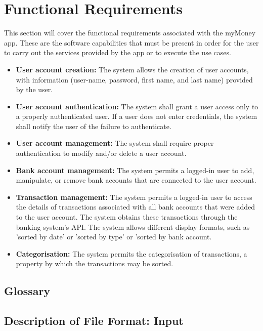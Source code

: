 \documentclass[11pt]{article}
\newcounter{use case ID}
\newcounter{req ID}
\begin{document}
\clearpage

\section{Functional Requirements} \label{func req}

This section will cover the functional requirements associated with the myMoney app. These are the software capabilities that must be present in order for the user to carry out the services provided by the app or to execute the use cases.

\begin{itemize}
    \item  \textbf{User account creation:} The system allows the creation of user accounts, with information (user-name, password, first name, and last name) provided by the user.
    \item \textbf{User account authentication:} The system shall grant a user access only to a properly authenticated user. If a user does not enter credentials, the system shall notify the user of the failure to authenticate.
    \item \textbf{User account management:} The system shall require proper authentication to modify and/or delete a user account.
    \item  \textbf{Bank account management:} The system permits a logged-in user to add, manipulate, or remove bank accounts that are connected to the user account.
    \item  \textbf{Transaction management:} The system permits a logged-in user to access the details of transactions associated with all bank accounts that were added to the user account. The system obtains these transactions through the banking system's API. The system allows different display formats, such as 'sorted by date' or 'sorted by type' or 'sorted by bank account.
    \item \textbf{Categorisation:} The system permits the categorisation of transactions, a property by which the transactions may be sorted.
    \end{itemize}

\subsection{Glossary} \label{glossary}


\subsection{Description of File Format: Input}
\end{document}
